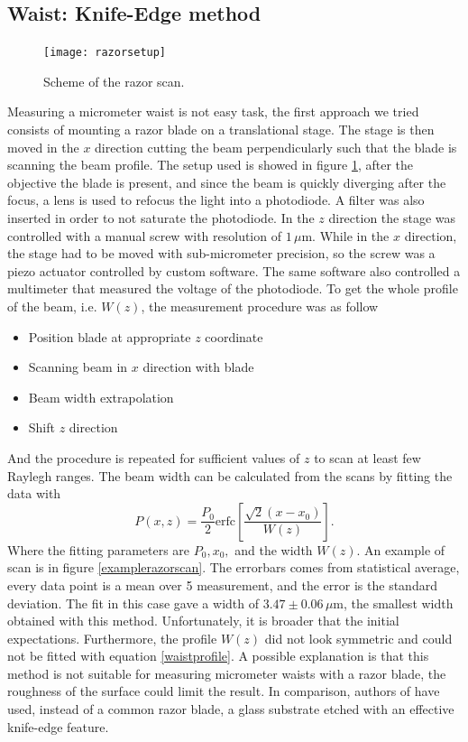 \subsection{Waist: Knife-Edge method}
\begin{figure}[H]
\centering
\texttt{[image: razorsetup]}
\caption{Scheme of the razor scan.}
\label{razorscan}
\end{figure}
Measuring a micrometer waist is not easy task, the first approach we tried consists of mounting a razor blade on a translational stage. The stage is then moved in the $x$ direction cutting the beam perpendicularly such that the blade is scanning the beam profile. The setup used is showed in figure \ref{razorscan}, after the objective the blade is present, and since the beam is quickly diverging after the focus, a lens is used to refocus the light into a photodiode. A filter was also inserted in order to not saturate the photodiode.
In the $z$ direction the stage was controlled with a manual screw with resolution of $1\,\mu$m. While in the $x$ direction, the stage had to be moved with sub-micrometer precision, so the screw was a piezo actuator controlled by custom software. The same software also controlled a multimeter that measured the voltage of the photodiode. To get the whole profile of the beam, i.e. $W(z)$, the measurement procedure was as follow
\begin{itemize}
\item Position blade at appropriate $z$ coordinate
\item Scanning beam in $x$ direction with blade
\item Beam width extrapolation
\item Shift $z$ direction
\end{itemize}
And the procedure is repeated for sufficient values of $z$ to scan at least few Raylegh ranges. The beam width can be calculated from the scans by fitting the data with \cite{knifeedge}
\begin{equation}
P(x,z) = \frac{P_0}{2}\text{erfc}\left[\frac{\sqrt{2}(x-x_0)}{W(z)} \right].
\end{equation}
Where the fitting parameters are $P_0, x_0,$ and the width $W(z)$. An example of scan is in figure \ref{examplerazorscan}. The errorbars comes from statistical average, every data point is a mean over 5 measurement, and the error is the standard deviation. The fit in this case gave a width of $3.47\pm 0.06\,\mu$m, the smallest width obtained with this method. Unfortunately, it is broader that the initial expectations. Furthermore, the profile $W(z)$ did not look symmetric and could not be fitted with equation \eqref{waistprofile}. A possible explanation is that this method is not suitable for measuring micrometer waists with a razor blade, the roughness of the surface could limit the result. In comparison, authors of \cite{Cannon:86} have used, instead of a common razor blade, a glass substrate etched with an effective knife-edge feature.
